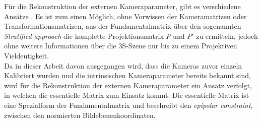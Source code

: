 %
%
%
%



Für die Rekonstruktion der externen Kameraparameter, gibt es verschiedene Ansätze \cite{HZ}. Es ist zum einen Möglich, ohne Vorwissen der Kameramatrizen oder Transformationsmatrizen, aus der Fundamentalmatrix über den sogenannten \textit{Stratified approach} die komplette Projektionsmatrix $P$ und $P'$ zu ermitteln, jedoch ohne weitere Informationen über die 3S-Szene nur bis zu einem Projektiven Vieldeutigkeit\cite{HZ}. \\

Da in dieser Arbeit davon ausgegangen wird, dass die Kameras zuvor einzeln Kalibriert wurden und die intrinsischen Kameraparameter bereits bekannt sind, wird für die Rekonstruktion der externen Kameraparameter ein Ansatz verfolgt, in welchen die essentielle Matrix zum Einsatz kommt. Die essentielle Matrix ist eine Spezialform der Fundamentalmatrix und beschreibt den \textit{epipolar constraint}, zwischen den normierten Bildebenenkoordinaten\cite{HZ,Elements,ZZGXr,Zhang2014,Ferid}. 

